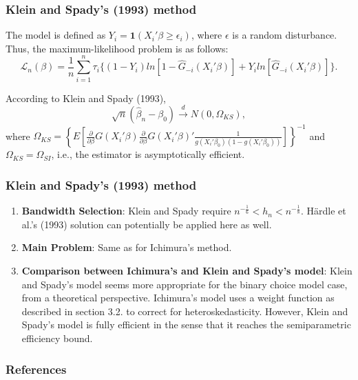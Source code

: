 \documentclass[11pt]{beamer}
\begin{document}
\begin{frame}[t]
    \frametitle{Klein and Spady's (1993) method}
The model is defined as $Y_i =  \mathbf{1}{(X_i'\beta \geq \epsilon_i)}$, where $\epsilon$ is a random disturbance.
Thus, the maximum-likelihood problem is as follows:
\begin{equation}
\mathcal{L}_n(\beta) = \frac{1}{n}\sum_{i=1}^n \tau_{i}\{ (1 - Y_i)ln[ 1 - \hat{G}_{-i}(X_i'\beta)] +  Y_iln[\hat{G}_{-i}(X_i'\beta)]\}.
\end{equation}
\begin{theorem}
According to Klein and Spady (1993),
\[\sqrt{n}(\hat{\beta}_{n} - \beta_0) \stackrel{d}{\rightarrow} N(0,\Omega_{KS}),
\]
where $ \Omega_{KS} = \left\{ E\left[\frac{\partial}{\partial \beta}
 G(X_i'\beta)\frac{\partial}{\partial \beta} G(X_i'\beta)'\frac{1}{g(X_i'\beta_0)(1 - g(X_i'\beta_0))} \right]\right\}^{-1} $
 and $\Omega_{KS} = \Omega_{SI}$, i.e., the estimator is asymptotically efficient.

\end{theorem}
\end{frame}

\begin{frame}[t]
    \frametitle{Klein and Spady's (1993) method}

\begin{enumerate}
	\item \textbf{Bandwidth Selection}: Klein and Spady require $ n^{-\frac{1}{6}} < h_n < n^{-\frac{1}{8}}$. H{\"a}rdle et al.'s (1993) solution can potentially be applied here as well.
	\item \textbf{Main Problem}: Same as for Ichimura's method.
	\item \textbf{Comparison between Ichimura's and Klein and Spady's model}:
	Klein and Spady's model seems more appropriate for the binary choice model case, from a theoretical perspective. Ichimura's model uses a weight function as described in section 3.2. to correct for heteroskedasticity. However, Klein and Spady's model is fully efficient in the sense that it reaches the semiparametric efficiency bound.
\end{enumerate}
\end{frame}
 {
    \begin{frame}
        \frametitle{}
    \end{frame}

}

\begin{frame}[allowframebreaks]
    \frametitle{References}
    \renewcommand{\bibfont}{\normalfont\footnotesize}
    \printbibliography
\end{frame}
\end{document}
